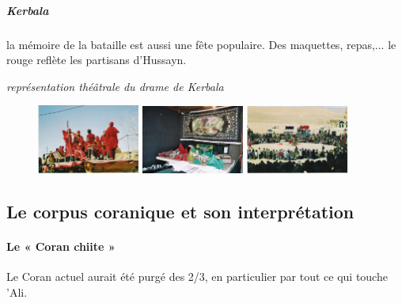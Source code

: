  \subparagraph{Kerbala} la mémoire de la bataille est aussi une fête populaire. Des maquettes, repas,... le rouge reflète les partisans d'Hussayn.
 
 \begin{Def}[ta'ziyya]
\emph{représentation théâtrale du drame de Kerbala}
 \end{Def}

\begin{figure}[h!]
    \centering
    \includegraphics[width=0.3\textwidth]{CourantsIslamContemporain/ImagesCourantsIslamContemporain/image9.jpeg}
    \includegraphics[width=0.3\textwidth]{CourantsIslamContemporain/ImagesCourantsIslamContemporain/image10Chiisme.jpeg}
        \includegraphics[width=0.3\textwidth]{CourantsIslamContemporain/ImagesCourantsIslamContemporain/image8.jpeg}


    \label{fig:my_label}
\end{figure}
 
 
 
  \subsection{Le corpus coranique et son interprétation}
 
 
  \paragraph{Le « Coran chiite »}
 
 Le Coran actuel aurait été purgé des 2/3, en particulier par tout ce qui touche 'Ali.


